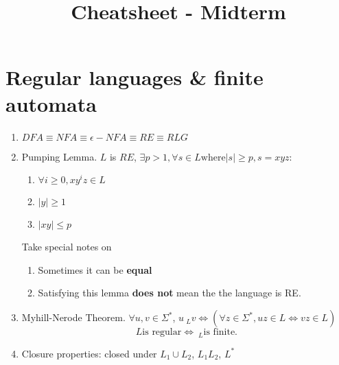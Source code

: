 \documentclass{article}
\title{
    \vspace{-0.4in}
    \textmd{\textbf{\hmwkClass \\ Cheatsheet - Midterm}}\\
}
\author{\hmwkAuthorName}
\date{}
\newcommand{\U}{\Sigma^*}
\begin{document}
\maketitle
\thispagestyle{fancy}

\begin{comment}
\setcounter{section}{-1}
\section{Introduction}\begin{enumerate}
	\item Proof ideas are important? Too lazy to list them out...
\end{enumerate}
\end{comment}

\section{Regular languages \& finite automata}\begin{enumerate}
	\item $DFA \equiv NFA \equiv \epsilon-NFA \equiv RE \equiv RLG$
	\item Pumping Lemma. $L$ is $RE$, $\exists p > 1, \forall s \in L \text{where} |s| \ge p, s = xyz$:
	\begin{enumerate}
		\item $\forall i \ge 0, xy^iz \in L$
		\item $|y| \ge 1$
		\item $|xy| \le p$
	\end{enumerate}
	Take special notes on
	\begin{enumerate}
		\item Sometimes it can be \textbf{equal}
		\item Satisfying this lemma \textbf{does not} mean the the language is RE.
	\end{enumerate} 
	\item Myhill-Nerode Theorem. $\forall u, v\in \U$, $u ~_L v \Longleftrightarrow (\forall z \in \U, uz \in L \Leftrightarrow vz \in L)$ \\
	$$L \text{is regular} \Longleftrightarrow ~_L \text{is finite.} $$
	\item Closure properties: closed under $L_1 \cup L_2$, $L_1L_2$, $L^*$
\end{enumerate}
\end{document}
